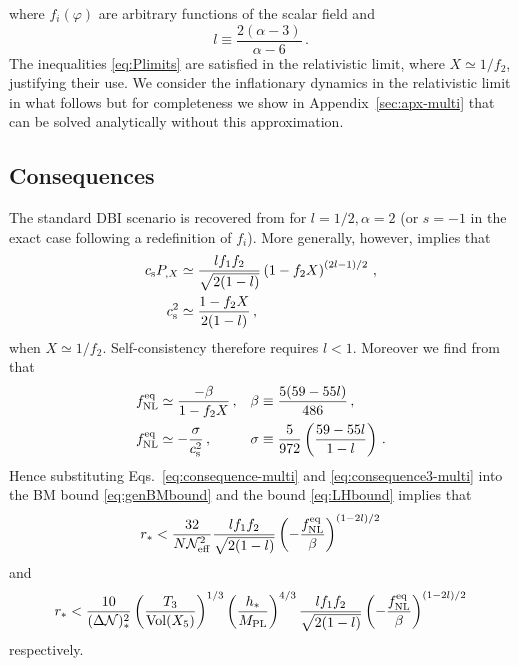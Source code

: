 % 
where $f_i (\varphi )$ are arbitrary functions of the scalar 
field and
%  
\begin{equation}
l \equiv \frac{2(\alpha -3 )}{\alpha -6} \, . 
\end{equation}
% 
The inequalities \eqref{eq:Plimits} 
are satisfied in the relativistic limit, where $X \simeq 1/f_2$, justifying their use.
We consider the inflationary dynamics in the relativistic limit in what follows but for
completeness we show in Appendix~\ref{sec:apx-multi} that  can be solved
analytically without this approximation. 




\subsection{Consequences}
\label{sec:consequences-multi}

The standard DBI scenario is recovered from  for
$l=1/2, \alpha = 2$ (or $s=-1$ in the exact case following a redefinition of
$f_i$). 
More generally, however,  implies that  
% 
\begin{align}
\label{eq:consequence-multi}
c_\mathrm{s} P_{,X} &\simeq \frac{l f_1 f_2}{\sqrt{2(1-l)}} \left( 
1- f_2X \right)^{(2l-1)/2} \,,
\\
c_\mathrm{s}^2 &\simeq \frac{1-f_2X}{2(1-l)} \,,
\end{align}
% 
when $X \simeq 1/f_2$. Self-consistency therefore
requires $l<1$. Moreover
we find from  that
%  
\begin{align}
\label{eq:consequence3-multi}
f_{\mathrm{NL}}^{\mathrm{eq}} &\simeq \frac{-\beta}{1-f_2X}\,, & \beta &\equiv \frac{5(59-55l)}{486}
\,,
\\
\label{eq:consequence4-multi}
f_{\mathrm{NL}}^{\mathrm{eq}} &\simeq -\frac{\sigma}{c_\mathrm{s}^2}\,, & \sigma &\equiv 
\frac{5}{972} \left( \frac{59-55l}{1-l} \right) \,.
\end{align}
% 
Hence substituting Eqs.~\eqref{eq:consequence-multi} and
\eqref{eq:consequence3-multi} 
into the BM bound \eqref{eq:genBMbound} and the bound \eqref{eq:LHbound}
implies that
%  
\begin{equation}
\label{eq:weakBM-multi}
r_*< \frac{32}{N \mathcal{N}_\mathrm{eff}^2} \frac{l f_1 f_2}{\sqrt{2(1-l)}}
\left( -\frac{f_{\mathrm{NL}}^{\mathrm{eq}}}{\beta} \right)^{(1-2l)/2}
\end{equation}
% 
and
%  
\begin{equation}
\label{eq:weakLH-multi}
r_* < \frac{10}{(\Delta \mathcal{N})_*^2} \left( \frac{T_3}{\mathrm{Vol} (X_5)} \right)^{1/3} 
\left( \frac{h_*}{M_{\mathrm{PL}}} \right)^{4/3}
\frac{l f_1 f_2}{\sqrt{2(1-l)}}
\left( -\frac{f_{\mathrm{NL}}^{\mathrm{eq}}}{\beta} \right)^{(1-2l)/2}
\end{equation}
% 
respectively. 


